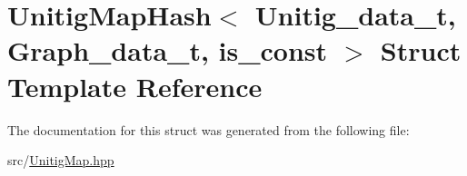\hypertarget{structUnitigMapHash}{}\section{Unitig\+Map\+Hash$<$ Unitig\+\_\+data\+\_\+t, Graph\+\_\+data\+\_\+t, is\+\_\+const $>$ Struct Template Reference}
\label{structUnitigMapHash}


The documentation for this struct was generated from the following file\+:\begin{DoxyCompactItemize}
\item 
src/\hyperlink{UnitigMap_8hpp}{Unitig\+Map.\+hpp}\end{DoxyCompactItemize}
